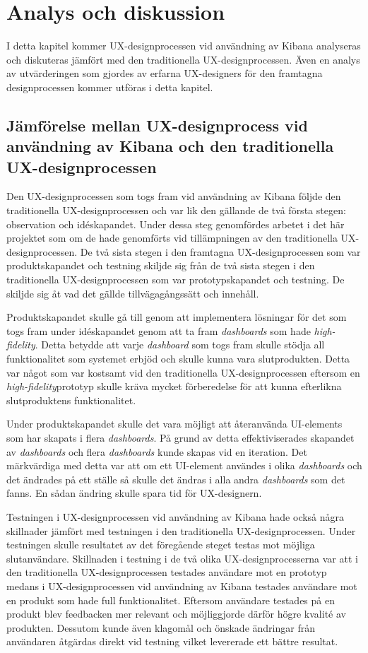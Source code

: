 \documentclass[12pt]{kththesis}
\begin{document}
\afterpage{\null\newpage}

\chapter{Analys och diskussion}
I detta kapitel kommer UX-designprocessen vid användning av Kibana analyseras och diskuteras jämfört med den traditionella UX-designprocessen. Även en analys av utvärderingen som gjordes av erfarna UX-designers för den framtagna designprocessen kommer utföras i detta kapitel. 

\section{ Jämförelse mellan UX-designprocess vid användning av Kibana och den traditionella UX-designprocessen}
Den UX-designprocessen som togs fram vid användning av Kibana följde den traditionella UX-designprocessen och var lik den gällande de två första stegen: observation och idéskapandet. Under dessa steg genomfördes arbetet i det här projektet som om de hade genomförts vid tillämpningen av den traditionella UX-designprocessen. De två sista stegen i den framtagna UX-designprocessen som var produktskapandet och testning skiljde sig från de två sista stegen i den traditionella UX-designprocessen som var prototypskapandet och testning. De skiljde sig åt vad det gällde tillvägagångssätt och innehåll. 

Produktskapandet skulle gå till genom att implementera lösningar för det som togs fram under idéskapandet genom att ta fram \textit{dashboards} som hade \textit{high-fidelity}. Detta betydde att varje \textit{dashboard} som togs fram skulle stödja all funktionalitet som systemet erbjöd och skulle kunna vara slutprodukten. Detta var något som var kostsamt vid den traditionella UX-designprocessen eftersom en \textit{high-fidelity}prototyp skulle kräva mycket förberedelse för att kunna efterlikna slutproduktens funktionalitet. 

Under produktskapandet skulle det vara möjligt att återanvända UI-elements som har skapats i flera \textit{dashboards}. På grund av detta effektiviserades skapandet av \textit{dashboards} och flera \textit{dashboards} kunde skapas vid en iteration. Det märkvärdiga med detta var att om ett UI-element användes i olika \textit{dashboards} och det ändrades på ett ställe så skulle det ändras i alla andra \textit{dashboards} som det fanns. En sådan ändring skulle spara tid för UX-designern. 

Testningen i UX-designprocessen vid användning av Kibana hade också några skillnader jämfört med testningen i den traditionella UX-designprocessen. Under testningen skulle resultatet av det föregående steget testas mot möjliga slutanvändare. Skillnaden i testning i de två olika UX-designprocesserna var att i den traditionella UX-designprocessen testades användare mot en prototyp medans i UX-designprocessen vid användning av Kibana testades användare mot en produkt som hade full funktionalitet. Eftersom användare testades på en produkt blev feedbacken mer relevant och möjliggjorde därför högre kvalité av produkten. Dessutom kunde även klagomål och önskade ändringar från användaren åtgärdas direkt vid testning vilket levererade ett bättre resultat.
\end{document}
